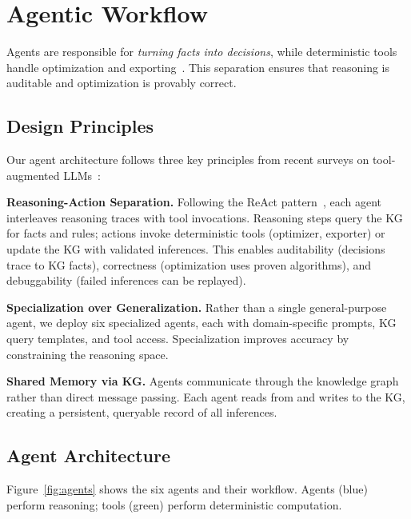 
\section{Agentic Workflow}
\label{sec:agents}

Agents are responsible for \emph{turning facts into decisions}, while deterministic tools handle optimization and exporting~\cite{wang2024agents_survey, xi2023agents_rise, li2025agentic_survey}.
This separation ensures that reasoning is auditable and optimization is provably correct.

\subsection{Design Principles}

Our agent architecture follows three key principles from recent surveys on tool-augmented LLMs~\cite{zhang2025tool_learning, schick2023toolformer}:

\textbf{Reasoning-Action Separation.}
Following the ReAct pattern~\cite{yao2023react}, each agent interleaves reasoning traces with tool invocations.
Reasoning steps query the KG for facts and rules; actions invoke deterministic tools (optimizer, exporter) or update the KG with validated inferences.
This enables auditability (decisions trace to KG facts), correctness (optimization uses proven algorithms), and debuggability (failed inferences can be replayed).

\textbf{Specialization over Generalization.}
Rather than a single general-purpose agent, we deploy six specialized agents, each with domain-specific prompts, KG query templates, and tool access.
Specialization improves accuracy by constraining the reasoning space.

\textbf{Shared Memory via KG.}
Agents communicate through the knowledge graph rather than direct message passing.
Each agent reads from and writes to the KG, creating a persistent, queryable record of all inferences.

\subsection{Agent Architecture}

Figure~\ref{fig:agents} shows the six agents and their workflow.
Agents (blue) perform reasoning; tools (green) perform deterministic computation.

